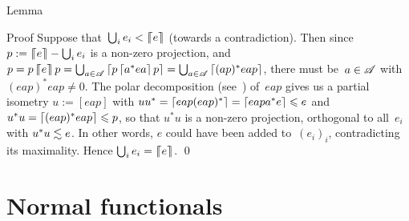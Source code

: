 \documentclass[a]{subfiles}
\begin{document}
\begin{parsec}
\begin{point}{Lemma}
\begin{point}{Proof}
Suppose that~$\bigcup_i e_i < \left\lceil\!\!\left\lceil e\right\rceil\!\!\right\rceil$
(towards a contradiction).
Then since $p:=\left\lceil\!\!\left\lceil e\right\rceil\!\!\right\rceil-\bigcup_i e_i $ 
is a non-zero projection,
and~$p=p\left\lceil\!\!\left\lceil e\right\rceil\!\!\right\rceil p
=\bigcup_{a\in\mathscr{A}} \left\lceil p\left\lceil a^*ea\right\rceil p\right\rceil
= \bigcup_{a\in\mathscr{A}} \left\lceil(ap)^*eap\right\rceil$,
there must be~$a\in\mathscr{A}$ with $(eap)^*eap\neq 0$.
The polar decomposition (see~)
of~$eap$
gives us a partial isometry $u:=[eap]$
with $uu^* = \left\lceil eap(eap)^*\right\rceil=\left\lceil eapa^*e\right\rceil\leqslant e$
and $u^*u= \left\lceil(eap)^*eap\right\rceil\leqslant p$,
so that $u^*u$ is a non-zero projection,
orthogonal to all~$e_i$ with $u^*u \vmleq e$.
In other words,
$e$ could have been added to~$(e_i)_i$,
contradicting its maximality.
Hence $\bigcup_i e_i = \left\lceil\!\!\left\lceil e\right\rceil\!\!\right\rceil$.
\qed
\end{point}
\end{point}
\end{parsec}

\section{Normal functionals}
\end{document}
